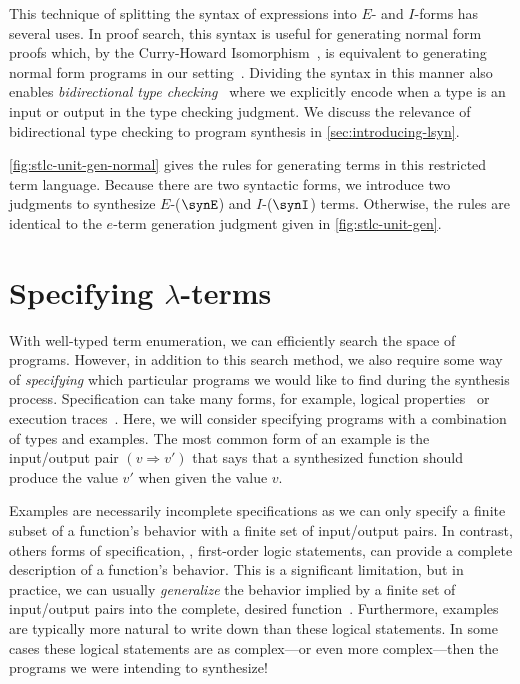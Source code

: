 This technique of splitting the syntax of expressions into $E$- and $I$-forms has several uses.
In proof search, this syntax is useful for generating normal form proofs which, by the Curry-Howard Isomorphism~, is equivalent to generating normal form programs in our setting~.
Dividing the syntax in this manner also enables \emph{bidirectional type checking}~ where we explicitly encode when a type is an input or output in the type checking judgment.
We discuss the relevance of bidirectional type checking to program synthesis in \autoref{sec:introducing-lsyn}.



\autoref{fig:stlc-unit-gen-normal} gives the rules for generating \stlcu{} terms in this restricted term language.
Because there are two syntactic forms, we introduce two judgments to synthesize $E$-($\synE$) and $I$-($\synI$) terms.
Otherwise, the rules are identical to the $e$-term generation judgment given in \autoref{fig:stlc-unit-gen}.

\section{Specifying \texorpdfstring{$λ$}{λ}-terms}
\label{sec:specifying-lambda-terms}

With well-typed term enumeration, we can efficiently search the space of \stlcu{} programs.
However, in addition to this search method, we also require some way of \emph{specifying} which particular programs we would like to find during the synthesis process.
Specification can take many forms, for example, logical properties~ or execution traces~.
Here, we will consider specifying programs with a combination of types and examples.
The most common form of an example is the input/output pair $(v ⇒ v')$ that says that a synthesized function should produce the value $v'$ when given the value $v$.

Examples are necessarily incomplete specifications as we can only specify a finite subset of a function's behavior with a finite set of input/output pairs.
In contrast, others forms of specification, \eg, first-order logic statements, can provide a complete description of a function's behavior.
This is a significant limitation, but in practice, we can usually \emph{generalize} the behavior implied by a finite set of input/output pairs into the complete, desired function~.
Furthermore, examples are typically more natural to write down than these logical statements.
In some cases these logical statements are as complex---or even more complex---then the programs we were intending to synthesize!

